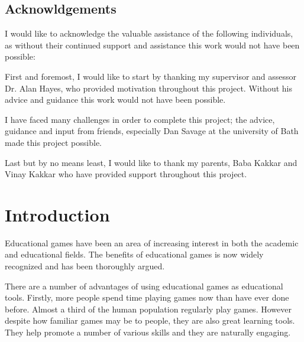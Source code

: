 \documentclass[a4paper,11.5pt]{report}
\makeatletter
\numberwithin{figure}{section}
\numberwithin{table}{section}
\numberwithin{equation}{section}
\numberwithin{equation}{section}
\newcommand\mainmatter{%
    \cleardoublepage
  \pagenumbering{arabic}}
\newcommand\blankpage{%
    \null
    \thispagestyle{empty}%
    \addtocounter{page}{-1}%
    \newpage}
\makeatother
\begin{document}
\newpage
\hfill
\section*{\Huge{Acknowldgements}}

I would like to acknowledge the valuable assistance of the following individuals, as without their continued support and assistance this work would not have been possible:

First and foremost, I would like to start by thanking my supervisor and assessor Dr. Alan Hayes, who provided motivation throughout this project. Without his advice and guidance this work would not have been possible.

I have faced many challenges in order to complete this project; the advice, guidance and input from friends, especially Dan Savage at the university of Bath made this project possible.

Last but by no means least, I would like to thank my parents, Baba Kakkar and Vinay Kakkar who have provided support throughout this project.
 
\afterpage{\blankpage}

\mainmatter

\chapter{Introduction}


Educational games have been an area of increasing interest in both the academic and educational fields. The benefits of educational games is now widely recognized and has been thoroughly argued.


There are a number of advantages of using educational games as educational tools. Firstly, more people spend time playing games now than have ever done before. Almost a third of the human population regularly play games. However despite how familiar games may be to people, they are also great learning tools. They help promote a number of various skills and they are naturally engaging.
\end{document}
